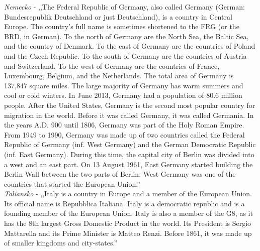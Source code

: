 \noindent
\textit{Nemecko} - ,,The Federal Republic of Germany, also called Germany (German: Bundesrepublik Deutschland or just Deutschland), is a country in Central Europe. The country's full name is sometimes shortened to the FRG (or the BRD, in German). To the north of Germany are the North Sea, the Baltic Sea, and the country of Denmark. To the east of Germany are the countries of Poland and the Czech Republic. To the south of Germany are the countries of Austria and Switzerland. To the west of Germany are the countries of France, Luxembourg, Belgium, and the Netherlands. The total area of Germany is 137,847 square miles. The large majority of Germany has warm summers and cool or cold winters. In June 2013, Germany had a population of 80.6 million people. After the United States, Germany is the second most popular country for migration in the world. Before it was called Germany, it was called Germania. In the years A.D. 900 until 1806, Germany was part of the Holy Roman Empire. From 1949 to 1990, Germany was made up of two countries called the Federal Republic of Germany (inf. West Germany) and the German Democratic Republic (inf. East Germany). During this time, the capital city of Berlin was divided into a west and an east part. On 13 August 1961, East Germany started building the Berlin Wall between the two parts of Berlin. West Germany was one of the countries that started the European Union.'' \\

\noindent
\textit{Taliansko} - ,,Italy is a country in Europe and a member of the European Union. Its official name is Repubblica Italiana. Italy is a democratic republic and is a founding member of the European Union. Italy is also a member of the G8, as it has the 8th largest Gross Domestic Product in the world. Its President is Sergio Mattarella and its Prime Minister is Matteo Renzi. Before 1861, it was made up of smaller kingdoms and city-states.'' \\

